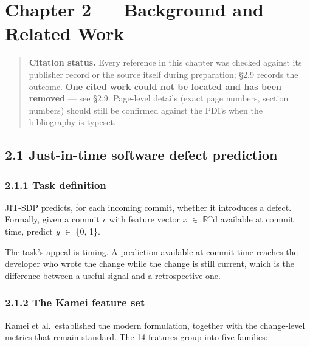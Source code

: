 \chapter{Chapter 2 --- Background and Related
Work}\label{chapter-2-background-and-related-work}

\begin{quote}
\textbf{Citation status.} Every reference in this chapter was checked
against its publisher record or the source itself during preparation;
\S{}2.9 records the outcome. \textbf{One cited work could not be located
and has been removed} --- see \S{}2.9. Page-level details (exact page
numbers, section numbers) should still be confirmed against the PDFs
when the bibliography is typeset.
\end{quote}

\section{2.1 Just-in-time software defect
prediction}\label{just-in-time-software-defect-prediction}

\subsection{2.1.1 Task definition}\label{task-definition}

JIT-SDP predicts, for each incoming commit, whether it introduces a
defect. Formally, given a commit \emph{c} with feature vector \emph{x} \ensuremath{\in}
\ensuremath{\mathbb{R}}\^{}d available at commit time, predict \emph{y} \ensuremath{\in} \{0, 1\}.

The task's appeal is timing. A prediction available at commit time
reaches the developer who wrote the change while the change is still
current, which is the difference between a useful signal and a
retrospective one.

\subsection{2.1.2 The Kamei feature set}\label{the-kamei-feature-set}

Kamei et al.~established the modern formulation, together with the
change-level metrics that remain standard. The 14 features group into
five families:

